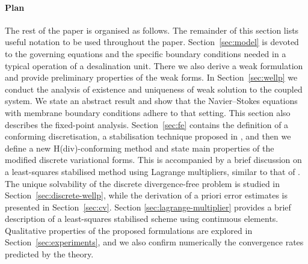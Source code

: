 \documentclass[onefignum,onetabnum,reqno,a4paper,final]{siamart250211}
\newcommand\0{\mathbf{0}}
\numberwithin{figure}{section}
\numberwithin{table}{section}
\begin{document}
	\paragraph{Plan}
	The rest of the paper is organised as follows. The remainder of this section lists useful notation to be used throughout the paper. Section~\ref{sec:model} is devoted to  the governing equations and the specific boundary conditions needed in a typical operation of a desalination unit. There we also derive a weak formulation and provide preliminary properties of the weak forms. In Section~\ref{sec:wellp} we conduct the analysis of existence and uniqueness of weak solution to the coupled system. We state an abstract result and show that the Navier--Stokes equations with membrane boundary conditions adhere to that setting. This section also describes the fixed-point analysis. Section~\ref{sec:fe} contains the definition of a conforming discretisation, a stabilisation technique proposed in \cite{verfurth91}, and then we define a new H(div)-conforming method and state main properties of the modified discrete variational forms. {This is accompanied by a brief discussion on a least-squares stabilised method using Lagrange multipliers, similar to that of \cite{verfurth86,verfurth91}}. The unique solvability of the discrete {divergence-free} problem is studied in Section~\ref{sec:discrete-wellp}, while the derivation of a priori error estimates is presented in Section~\ref{sec:cv}. Section \ref{sec:lagrange-multiplier} provides a brief description of a least-squares stabilised scheme using continuous elements. Qualitative properties of the proposed formulations are explored in Section~\ref{sec:experiments}, and we also confirm numerically the convergence rates predicted by the theory.
	
	
\end{document}
